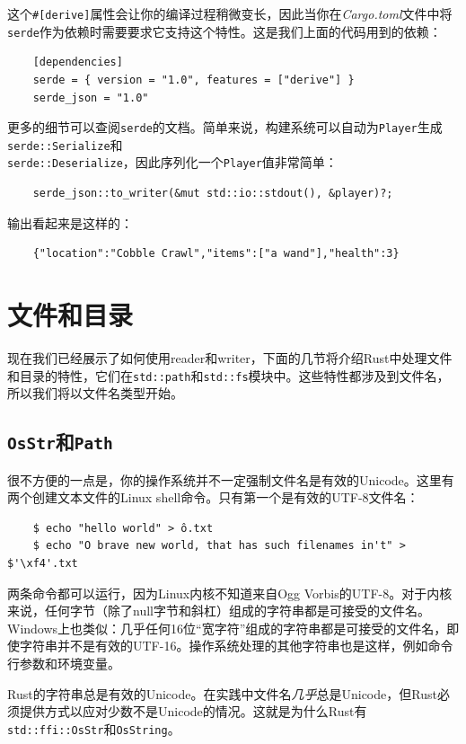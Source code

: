 这个\texttt{\#[derive]}属性会让你的编译过程稍微变长，因此当你在\emph{Cargo.toml}文件中将\texttt{serde}作为依赖时需要要求它支持这个特性。这是我们上面的代码用到的依赖：
\begin{verbatim}
    [dependencies]
    serde = { version = "1.0", features = ["derive"] }
    serde_json = "1.0"
\end{verbatim}

更多的细节可以查阅\texttt{serde}的文档。简单来说，构建系统可以自动为\texttt{Player}生成\texttt{serde::Serialize}和\\
\texttt{serde::Deserialize}，因此序列化一个\texttt{Player}值非常简单：
\begin{verbatim}
    serde_json::to_writer(&mut std::io::stdout(), &player)?;
\end{verbatim}

输出看起来是这样的：
\begin{verbatim}
    {"location":"Cobble Crawl","items":["a wand"],"health":3}
\end{verbatim}

\section{文件和目录}
现在我们已经展示了如何使用reader和writer，下面的几节将介绍Rust中处理文件和目录的特性，它们在\texttt{std::path}和\texttt{std::fs}模块中。这些特性都涉及到文件名，所以我们将以文件名类型开始。

\subsection{\texttt{OsStr}和\texttt{Path}}
很不方便的一点是，你的操作系统并不一定强制文件名是有效的Unicode。这里有两个创建文本文件的Linux shell命令。只有第一个是有效的UTF-8文件名：
\begin{verbatim}
    $ echo "hello world" > ô.txt
    $ echo "O brave new world, that has such filenames in't" > $'\xf4'.txt
\end{verbatim}

两条命令都可以运行，因为Linux内核不知道来自Ogg Vorbis的UTF-8。对于内核来说，任何字节（除了null字节和斜杠）组成的字符串都是可接受的文件名。Windows上也类似：几乎任何16位“宽字符”组成的字符串都是可接受的文件名，即使字符串并不是有效的UTF-16。操作系统处理的其他字符串也是这样，例如命令行参数和环境变量。

Rust的字符串总是有效的Unicode。在实践中文件名\emph{几乎}总是Unicode，但Rust必须提供方式以应对少数不是Unicode的情况。这就是为什么Rust有\texttt{std::ffi::OsStr}和\texttt{OsString}。

